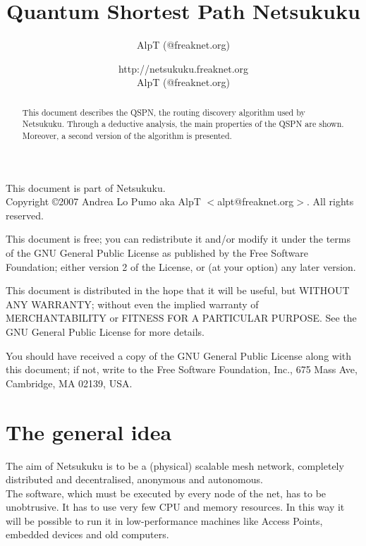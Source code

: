 \documentclass[a4paper]{article}
\title{Quantum Shortest Path Netsukuku}
\author{AlpT (@freaknet.org)}
\author{http://netsukuku.freaknet.org\\AlpT (@freaknet.org)}
\begin{document}
\maketitle

\begin{abstract}
	This document describes the QSPN, the routing discovery algorithm used
	by Netsukuku.
	Through a deductive analysis, the main properties of the QSPN are
	shown. Moreover, a second version of the algorithm is presented.
\end{abstract}
\pagebreak
\begin{small}
  This document is part of Netsukuku.\\
  Copyright \copyright 2007 Andrea Lo Pumo aka AlpT $<$alpt@freaknet.org$>$.
  All rights reserved.

  This document is free; you can redistribute it and/or modify it
  under the terms of the GNU General Public License as published by
  the Free Software Foundation; either version 2 of the License, or
  (at your option) any later version.

  This document is distributed in the hope that it will be useful, but
  WITHOUT ANY WARRANTY; without even the implied warranty of
  MERCHANTABILITY or FITNESS FOR A PARTICULAR PURPOSE\@.  See the GNU
  General Public License for more details.

  You should have received a copy of the GNU General Public License
  along with this document; if not, write to the Free Software
  Foundation, Inc., 675 Mass Ave, Cambridge, MA 02139, USA.
\end{small}

\clearpage
\tableofcontents
\clearpage
{}

\section{The general idea}
\label{sec:general_idea}

The aim of Netsukuku is to be a (physical) scalable mesh network, completely
distributed and decentralised, anonymous and autonomous.\\

The software, which must be executed by every node of the net, has to be
unobtrusive. It has to use very few CPU and memory resources. In this way it
will be possible to run it in low-performance machines like Access Points,
embedded devices and old computers.\\
\end{document}
